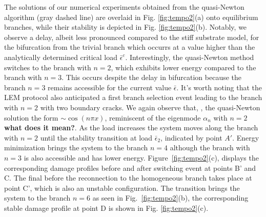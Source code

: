 The solutions of our numerical experiments obtained from the quasi-Newton algorithm (gray dashed line) are overlaid in Fig. \ref{fig:tempo2}(a) onto equilibrium branches, while their stability is depicted in Fig. \ref{fig:tempo2}(b). Notably, we observe a delay, albeit less pronounced compared to the stiff substrate model, for the bifurcation from the trivial branch which occurrs at a value  higher than the analytically determined critical load \(\bar{\epsilon}^c\). Interestingly, the quasi-Newton method switches to the branch with $n=2$, which exhibits lower energy compared to the branch with $n=3$. This occurs  despite the delay in bifurcation because the branch  $n=3$ remains accessible for the current value $\bar\epsilon$. It's worth noting that the LEM protocol also anticipated a first branch selection event leading to the branch with $n=2$ with two boundary cracks. 
We again observe that, , the quasi-Newton solution  the form \(\sim \cos(n\pi x)\), reminiscent of the eigenmode $\alpha_n$  with \(n=2\) \textbf{what does it mean?}. 
As the load increases the system moves along the branch with $n=2$ until the stability transition at load $\bar \epsilon_2$, indicated by point $A'$. Energy minimization brings the system to the branch $n=4$ although the branch with $n=3$ is also accessible and has lower energy. Figure~\ref{fig:tempo2}(c), displays the corresponding damage profiles before and after  switching event  at points B' and C. The final  before the reconnection to the homogeneous branch takes place at point C', which is also an unstable configuration. The transition brings the system to the branch $n=6$ as seen in Fig.~\ref{fig:tempo2}(b), the corresponding stable damage profile at point D is shown in Fig. \ref{fig:tempo2}(c). 

